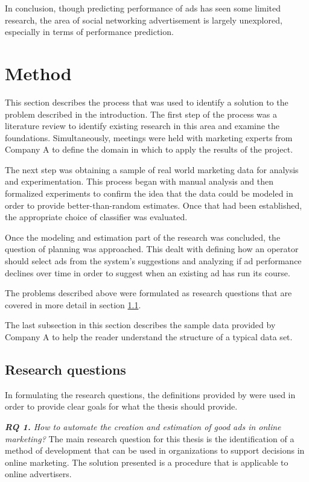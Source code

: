 \documentclass{sig-alternate}
\begin{document}
In conclusion, though predicting performance of ads has seen some limited research, the area of social networking advertisement is largely unexplored, especially in terms of performance prediction.

\section{Method}
\label{ch:Method}
This section describes the process that was used to identify a solution to the problem described in the introduction. The first step of the process was a literature review to identify existing research in this area and examine the foundations. Simultaneously, meetings were held with marketing experts from Company A to define the domain in which to apply the results of the project.

The next step was obtaining a sample of real world marketing data for analysis and experimentation. This process began with manual analysis and then formalized experiments to confirm the idea that the data could be modeled in order to provide better-than-random estimates. Once that had been established, the appropriate choice of classifier was evaluated.

Once the modeling and estimation part of the research was concluded, the question of planning was approached. This dealt with defining how an operator should select ads from the system's suggestions and analyzing if ad performance declines over time in order to suggest when an existing ad has run its course.

The problems described above were formulated as research questions that are covered in more detail in section \ref{sec:ResearchQuestions}.

The last subsection in this section describes the sample data provided by Company A to help the reader understand the structure of a typical data set.

\subsection{Research questions}
\label{sec:ResearchQuestions}
In formulating the research questions, the definitions provided by \cite{Shaw2002} were used in order to provide clear goals for what the thesis should provide.

\textit{\textbf{RQ 1.} How to automate the creation and estimation of good ads in online marketing?}
The main research question for this thesis is the identification of a method of development that can be used in organizations to support decisions in online marketing. The solution presented is a procedure that is applicable to online advertisers.
\end{document}
